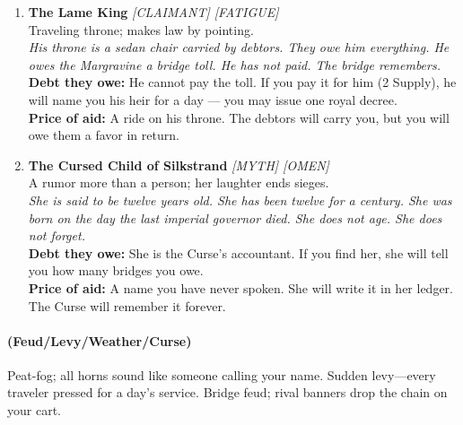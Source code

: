 \begin{enumerate}
\item \textbf{The Lame King} \hfill {} \textit{[CLAIMANT] [FATIGUE]} \\
  Traveling throne; makes law by pointing. \\
  \textit{His throne is a sedan chair carried by debtors. They owe him everything. He owes the Margravine a bridge toll. He has not paid. The bridge remembers.} \\
  \textbf{Debt they owe:} He cannot pay the toll. If you pay it for him (2 Supply), he will name you his heir for a day --- you may issue one royal decree. \\
  \textbf{Price of aid:} A ride on his throne. The debtors will carry you, but you will owe them a favor in return.

\item \textbf{The Cursed Child of Silkstrand} \hfill {} \textit{[MYTH] [OMEN]} \\
  A rumor more than a person; her laughter ends sieges. \\
  \textit{She is said to be twelve years old. She has been twelve for a century. She was born on the day the last imperial governor died. She does not age. She does not forget.} \\
  \textbf{Debt they owe:} She is the Curse's accountant. If you find her, she will tell you how many bridges you owe. \\
  \textbf{Price of aid:} A name you have never spoken. She will write it in her ledger. The Curse will remember it forever.
\end{enumerate}

\paragraph*{(Feud/Levy/Weather/Curse)} Peat-fog; all horns sound like someone calling your name. Sudden levy---every traveler pressed for a day's service. Bridge feud; rival banners drop the chain on your cart.

